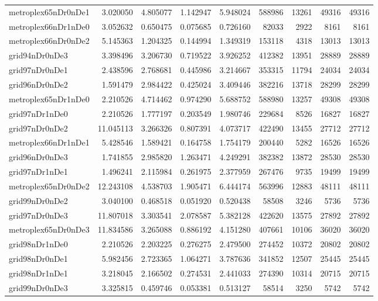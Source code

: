 \begin{longtable}{|l|r|r|r|r|r|r|r|r|}
metroplex65nDr0nDe1 & 3.020050 & 4.805077 & 1.142947 & 5.948024 & 588986 & 13261 & 49316 & 49316 \\
metroplex66nDr1nDe0 & 3.052632 & 0.650475 & 0.075685 & 0.726160 & 82033 & 2922 & 8161 & 8161 \\
metroplex66nDr0nDe2 & 5.145363 & 1.204325 & 0.144994 & 1.349319 & 153118 & 4318 & 13013 & 13013 \\
grid94nDr0nDe3 & 3.398496 & 3.206730 & 0.719522 & 3.926252 & 412382 & 13951 & 28889 & 28889 \\
grid97nDr0nDe1 & 2.438596 & 2.768681 & 0.445986 & 3.214667 & 353315 & 11794 & 24034 & 24034 \\
grid96nDr0nDe2 & 1.591479 & 2.984422 & 0.425024 & 3.409446 & 382216 & 13718 & 28299 & 28299 \\
metroplex65nDr1nDe0 & 2.210526 & 4.714462 & 0.974290 & 5.688752 & 588980 & 13257 & 49308 & 49308 \\
grid97nDr1nDe0 & 2.210526 & 1.777197 & 0.203549 & 1.980746 & 229684 & 8526 & 16827 & 16827 \\
grid97nDr0nDe2 & 11.045113 & 3.266326 & 0.807391 & 4.073717 & 422490 & 13455 & 27712 & 27712 \\
metroplex66nDr1nDe1 & 5.428546 & 1.589421 & 0.164758 & 1.754179 & 200440 & 5282 & 16526 & 16526 \\
grid96nDr0nDe3 & 1.741855 & 2.985820 & 1.263471 & 4.249291 & 382382 & 13872 & 28530 & 28530 \\
grid97nDr1nDe1 & 1.496241 & 2.115984 & 0.261975 & 2.377959 & 267476 & 9735 & 19499 & 19499 \\
metroplex65nDr0nDe2 & 12.243108 & 4.538703 & 1.905471 & 6.444174 & 563996 & 12883 & 48111 & 48111 \\
grid99nDr0nDe2 & 3.040100 & 0.468518 & 0.051920 & 0.520438 & 58508 & 3246 & 5736 & 5736 \\
grid97nDr0nDe3 & 11.807018 & 3.303541 & 2.078587 & 5.382128 & 422620 & 13575 & 27892 & 27892 \\
metroplex65nDr0nDe3 & 11.834586 & 3.265088 & 0.886192 & 4.151280 & 407661 & 10106 & 36020 & 36020 \\
grid98nDr1nDe0 & 2.210526 & 2.203225 & 0.276275 & 2.479500 & 274452 & 10372 & 20802 & 20802 \\
grid98nDr0nDe1 & 5.982456 & 2.723365 & 1.064271 & 3.787636 & 341852 & 12507 & 25445 & 25445 \\
grid98nDr1nDe1 & 3.218045 & 2.166502 & 0.274531 & 2.441033 & 274390 & 10314 & 20715 & 20715 \\
grid99nDr0nDe3 & 3.325815 & 0.459746 & 0.053381 & 0.513127 & 58514 & 3250 & 5742 & 5742 \\

\end{longtable}
